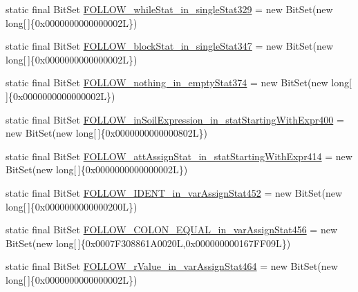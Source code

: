 \begin{DoxyCompactItemize}
\item 
static final Bit\-Set \hyperlink{classorg_1_1tzi_1_1use_1_1parser_1_1soil_1_1_soil_parser_a4311ad7f99fe1325ccca9221da2aefb8}{F\-O\-L\-L\-O\-W\-\_\-while\-Stat\-\_\-in\-\_\-single\-Stat329} = new Bit\-Set(new long\mbox{[}$\,$\mbox{]}\{0x0000000000000002\-L\})
\item 
static final Bit\-Set \hyperlink{classorg_1_1tzi_1_1use_1_1parser_1_1soil_1_1_soil_parser_a8beee25e4ae3d573502ef30e768369c6}{F\-O\-L\-L\-O\-W\-\_\-block\-Stat\-\_\-in\-\_\-single\-Stat347} = new Bit\-Set(new long\mbox{[}$\,$\mbox{]}\{0x0000000000000002\-L\})
\item 
static final Bit\-Set \hyperlink{classorg_1_1tzi_1_1use_1_1parser_1_1soil_1_1_soil_parser_a87b2fe593741cedaf3b23ac8b0388d31}{F\-O\-L\-L\-O\-W\-\_\-nothing\-\_\-in\-\_\-empty\-Stat374} = new Bit\-Set(new long\mbox{[}$\,$\mbox{]}\{0x0000000000000002\-L\})
\item 
static final Bit\-Set \hyperlink{classorg_1_1tzi_1_1use_1_1parser_1_1soil_1_1_soil_parser_af5a40a875b3c57e41d1508b07d01eaab}{F\-O\-L\-L\-O\-W\-\_\-in\-Soil\-Expression\-\_\-in\-\_\-stat\-Starting\-With\-Expr400} = new Bit\-Set(new long\mbox{[}$\,$\mbox{]}\{0x0000000000000802\-L\})
\item 
static final Bit\-Set \hyperlink{classorg_1_1tzi_1_1use_1_1parser_1_1soil_1_1_soil_parser_abe91975d34c4d1250d673b574c857486}{F\-O\-L\-L\-O\-W\-\_\-att\-Assign\-Stat\-\_\-in\-\_\-stat\-Starting\-With\-Expr414} = new Bit\-Set(new long\mbox{[}$\,$\mbox{]}\{0x0000000000000002\-L\})
\item 
static final Bit\-Set \hyperlink{classorg_1_1tzi_1_1use_1_1parser_1_1soil_1_1_soil_parser_a2ce6be1ff32a1396ae7d20c9097f4b49}{F\-O\-L\-L\-O\-W\-\_\-\-I\-D\-E\-N\-T\-\_\-in\-\_\-var\-Assign\-Stat452} = new Bit\-Set(new long\mbox{[}$\,$\mbox{]}\{0x0000000000000200\-L\})
\item 
static final Bit\-Set \hyperlink{classorg_1_1tzi_1_1use_1_1parser_1_1soil_1_1_soil_parser_a6545dff3fc8adfb6db1ab27c5b9de3d3}{F\-O\-L\-L\-O\-W\-\_\-\-C\-O\-L\-O\-N\-\_\-\-E\-Q\-U\-A\-L\-\_\-in\-\_\-var\-Assign\-Stat456} = new Bit\-Set(new long\mbox{[}$\,$\mbox{]}\{0x0007\-F308861\-A0020\-L,0x000000000167\-F\-F09\-L\})
\item 
static final Bit\-Set \hyperlink{classorg_1_1tzi_1_1use_1_1parser_1_1soil_1_1_soil_parser_a081a345ff5d77f10ba6f3510b440e7e9}{F\-O\-L\-L\-O\-W\-\_\-r\-Value\-\_\-in\-\_\-var\-Assign\-Stat464} = new Bit\-Set(new long\mbox{[}$\,$\mbox{]}\{0x0000000000000002\-L\})
\item 

\end{DoxyCompactItemize}
